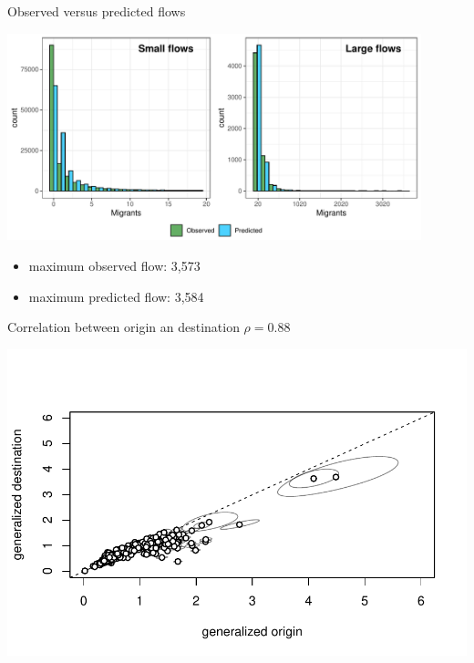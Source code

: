 \documentclass{beamer}
\begin{document}
\begin{frame}{Observed versus predicted flows}
\begin{center}
	\includegraphics[width=0.9\textwidth]{../fig/hist_fit}      
\end{center}
\begin{itemize}
	\item \alert{maximum} observed flow: 3,573
	\item \alert{maximum} predicted flow: 3,584
\end{itemize}
\end{frame}

\begin{frame}{Correlation between origin an destination $\rho = 0.88$}
				\begin{center}
		\includegraphics[width=\textwidth]{../fig/correlation}      
	\end{center}
\end{frame}
\end{document}
